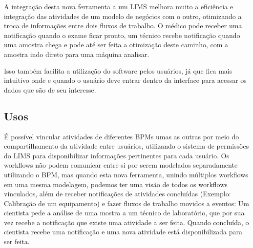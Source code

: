 
A integração desta nova ferramenta a um LIMS melhora muito a eficiência e integração das atividades de um modelo de negócios com o outro, otimizando a troca de informações entre dois fluxos de trabalho. O médico pode receber uma notificação quando o exame ficar pronto, um técnico recebe notificação quando uma amostra chega e pode até ser feita a otimização deste caminho, com a amostra indo direto para uma máquina analisar.

Isso também facilita a utilização do software pelos usuários, já que fica mais intuitivo onde e quando o usuário deve entrar dentro da interface para acessar os dados que são de seu interesse.


\subsection{Usos}

É possível vincular atividades de diferentes BPMs umas as outras por meio do compartilhamento da atividade entre usuários, utilizando o sistema de permissões do LIMS para disponibilizar informações pertinentes para cada usuário. Os workflows não podem comunicar entre si por serem modelados separadamente utilizando o BPM, mas quando esta nova ferramenta, unindo múltiplos workflows em uma mesma modelagem, podemos ter uma visão de todos os workflows vinculados, além de receber notificações de atividades concluídas (Exemplo: Calibração de um equipamento) e fazer fluxos de trabalho movidos a eventos: Um cientista pede a análise de uma mostra a um técnico de laboratório, que por sua vez recebe a notificação que existe uma atividade a ser feita. Quando concluída, o cientista recebe uma notificação e uma nova atividade está disponibilizada para ser feita.